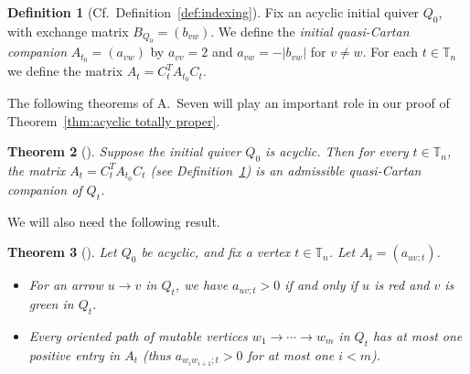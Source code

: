 \documentclass[11pt, letterpaper]{amsart}
\newcommand{\cS}[1]{{\noindent\textsf{\color{purple}$\blacksquare$~#1~$\blacksquare$}}}
\newtheorem{theorem}{Theorem}[section]
\theoremstyle{definition}
\newtheorem{definition}[theorem]{Definition}
\numberwithin{equation}{section}
\begin{document}

\begin{definition}[{Cf.\ Definition~\ref{def:indexing}}]
\label{def:A t}
Fix an acyclic initial quiver $Q_0$, with exchange matrix $B_{Q_0} = (b_{vw})$.
We define the \emph{initial quasi-Cartan companion} $A_{t_0} = (a_{vw})$ by $a_{vv}=2$ and $a_{vw} = - |b_{vw}|$ for $v\neq w$.
For each $t \in \mathbb T_n$ we define the matrix $A_t = C_t^T A_{t_0} C_t$.
\end{definition}

The following theorems of A.~Seven will play an important role in our proof of Theorem~\ref{thm:acyclic totally proper}.

\begin{theorem}[{\cite[Theorem 1.3]{SevenAMatrices}}]
\label{thm:SevenAdmissibleCompanions}
Suppose the initial quiver $Q_0$ is acyclic. %
Then for every $t \in \mathbb T_n$, the matrix $A_t = C_t^T A_{t_0} C_t$ (see Definition~\ref{def:A t}) is an admissible quasi-Cartan companion of $Q_t$. 
\end{theorem}


We will also need the following result. 
\pagebreak[3]

\begin{theorem}[{\cite[Theorems 1.3, 1.4]{SevenAMatrices}}]
\label{thm:seven A properties}
Let $Q_0$ be acyclic, and fix a vertex $t \in \mathbb T_n$.
Let $A_t= (a_{uv;t})$. %
\begin{itemize}
\item For an arrow $u \rightarrow v$ in $Q_t$, we have $a_{uv;t} > 0$ if and only if $u$ is red and $v$ is green in $Q_t$.
\item Every oriented path of mutable vertices $w_1 \rightarrow \cdots \rightarrow w_m$ in $Q_t$ has at most one positive entry in $A_t$ (thus $a_{w_i w_{i+1};t} > 0$ for at most one $i < m$).
\end{itemize}
\end{theorem}
\end{document}
